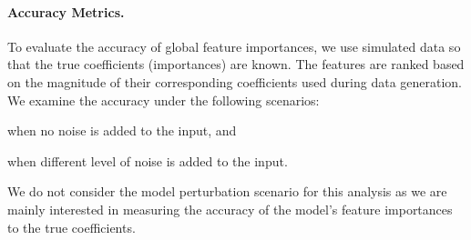\paragraph{Accuracy Metrics.}
To evaluate the accuracy of global feature importances, we use simulated data so that the true coefficients (importances) are known. The features are ranked based on the magnitude of their corresponding coefficients used during data generation. %
We examine the accuracy under the following scenarios: \begin{enumerate*}
    \item when no noise is added to the input, and
    \item when different level of noise is added to the input.
\end{enumerate*}
We do not consider the model perturbation scenario for this analysis as we are mainly interested in measuring the accuracy of the model's feature importances to the true coefficients.

